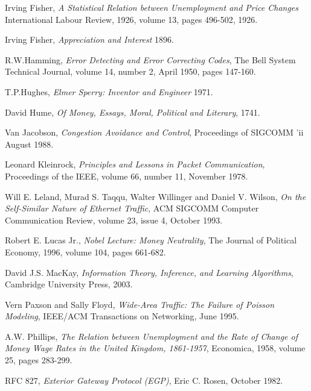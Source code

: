 \begin{thebibliography}{9}
    Irving Fisher, 
    \emph{A Statistical Relation between Unemployment and Price Changes}
    International Labour Review,
    1926,
    volume 13,
    pages 496-502,
    1926.

    Irving Fisher,
    \emph{Appreciation and Interest}
    1896.

    R.W.Hamming,
    \emph{Error Detecting and Error Correcting Codes},
    The Bell System Technical Journal,
    volume 14,
    number 2,
    April 1950,
    pages 147-160.

    T.P.Hughes,
    \emph{Elmer Sperry: Inventor and Engineer}
    1971.

    David Hume,
    \emph{Of Money, Essays, Moral, Political and Literary},
    1741.

    Van Jacobson,
    \emph{Congestion Avoidance and Control},
    Proceedings of SIGCOMM 'ii
    August 1988.

    Leonard Kleinrock,
    \emph{Principles and Lessons in Packet Communication},
    Proceedings of the IEEE,
    volume 66,
    number 11,
    November 1978.

    Will E. Leland, Murad S. Taqqu, Walter Willinger and Daniel V. Wilson,
    \emph{On the Self-Similar Nature of Ethernet Traffic},
    ACM SIGCOMM Computer Communication Review,
    volume 23,
    issue 4,
    October 1993.

    Robert E. Lucas Jr.,
    \emph{Nobel Lecture: Money Neutrality},
    The Journal of Political Economy,
    1996,
    volume 104,
    pages 661-682.


    David J.S. MacKay,
    \emph{Information Theory, Inference, and Learning Algorithms},
    Cambridge University Press,
    2003.

    Vern Paxson and Sally Floyd,
    \emph{Wide-Area Traffic: The Failure of Poisson Modeling},
    IEEE/ACM Transactions on Networking,
    June 1995.

    A.W. Phillips,
    \emph{The Relation between Unemployment and the Rate of Change of Money Wage Rates in the United Kingdom, 1861-1957},
    Economica,
    1958,
    volume 25,
    pages 283-299.

    RFC 827,
    \emph{Exterior Gateway Protocol (EGP)},
    Eric C. Rosen,
    October 1982.


\end{thebibliography}
